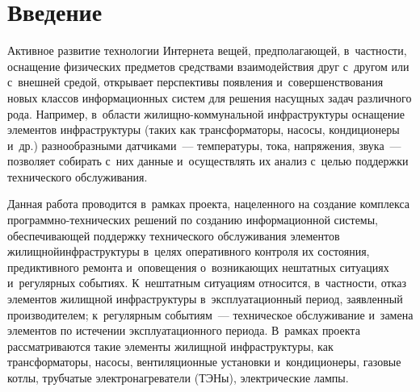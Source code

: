 
  



\thispagestyle{headings}

\begin{multicols}{2}

\label{st\stat}

\section{Введение}

      Активное развитие технологии Интернета вещей, предполагающей, 
в~частности, оснащение физических предметов средствами взаимодействия 
друг с~другом или с~внешней средой, открывает перспективы появления 
и~совершенствования новых классов информационных систем для решения 
насущных задач различного рода. Например, в~области  
жи\-лищ\-но-ком\-му\-наль\-ной инфраструктуры оснащение элементов 
инфраструктуры (таких как трансформаторы, насосы, кондиционеры и~др.) 
разнообразными датчиками~--- температуры, тока, напряжения, звука~--- 
позволяет собирать с~них данные и~осуществлять их анализ с~целью поддержки 
технического обслуживания. 

Данная работа проводится в~рамках проекта,\linebreak 
нацеленного на создание комплекса про\-грам\-мно-тех\-ни\-че\-ских решений по 
созданию информаци\-онной системы, обеспечивающей поддержку 
тех\-нического обслуживания элементов жилищной\linebreak инфраструктуры в~целях 
оперативного контроля их состояния, предиктивного ремонта и~оповещения 
о~возникающих нештатных ситуациях и~регулярных событиях. К~нештатным 
ситуациям относится, в~частности, отказ элементов жилищной инфраструктуры в~эксплуатационный период, заявленный производителем; к~регулярным 
событиям~--- техническое обслуживание и~замена элементов по истечении 
эксплуатационного периода. В~рамках проекта рассматриваются такие 
элементы жилищной инфраструктуры, как трансформаторы, насосы, 
вентиляционные установки и~кондиционеры, газовые котлы, трубчатые электронагреватели
(\mbox{ТЭНы}), 
электрические лампы.
      

\end{multicols}
